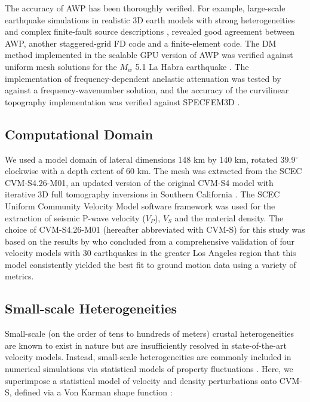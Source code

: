The accuracy of AWP has been thoroughly verified. For example, large-scale earthquake simulations in realistic 3D earth models with strong heterogeneities and complex finite-fault source descriptions \citep{bielakShakeOutEarthquakeScenario2010,bielak2016verification}, revealed good agreement between AWP, another staggered-grid FD code and a finite-element code. The DM method implemented in the scalable GPU version of AWP was verified against uniform mesh solutions for the $M_w$ 5.1 La Habra earthquake \citep{rotenHighfrequencyNonlinearEarthquake2018}. The implementation of frequency-dependent anelastic attenuation was tested by \citet{Withers2015} against a frequency-wavenumber solution, and the accuracy of the curvilinear topography implementation \citet{oreillySimulationElasticWaves2019} was verified against SPECFEM3D \citep{komatitschSpectralelementSimulationsGlobal2002}.


\subsection{Computational Domain}
We used a model domain of lateral dimensions 148 km by 140 km, rotated 39.9$^{\circ}$ clockwise with a depth extent of 60 km. The mesh was extracted from the SCEC CVM-S4.26-M01, an updated version of the original CVM-S4 model \citep{magistraleSCECSouthernCalifornia2000,kohlerMantleHeterogeneitiesSCEC2003} with iterative 3D full tomography inversions in Southern California \citep{leeRapidFullwaveCentroid2011}. The SCEC Uniform Community Velocity Model software framework \citep[V19.4][]{smallSCECUnifiedCommunity2017} was used for the extraction of seismic P-wave velocity ($V_P$), $V_S$ and the material density. The choice of CVM-S4.26-M01 (hereafter abbreviated with CVM-S) for this study was based on the results by \citet{tabordaEvaluationSouthernCalifornia2016} who concluded from a comprehensive validation of four velocity models with 30 earthquakes in the greater Los Angeles region that this model consistently yielded the best fit to ground motion data using a variety of metrics.

\subsection{Small-scale Heterogeneities}
Small-scale (on the order of tens to hundreds of meters) crustal heterogeneities are known to exist in nature but are insufficiently resolved in state-of-the-art velocity models. Instead, small-scale heterogeneities are commonly included in numerical simulations via statistical models of property fluctuations . Here, we superimpose a statistical model of velocity and density perturbations onto CVM-S, defined via a Von Karman shape function \citep{frankelFiniteDifferenceSimulations1986}:

